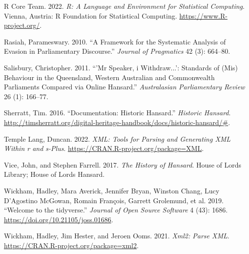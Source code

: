 \documentclass[
  letterpaper,
  DIV=11,
  numbers=noendperiod]{scrartcl}
\newlength{\cslhangindent}
\newlength{\cslentryspacingunit} %
\newenvironment{CSLReferences}[2] %
 {%
  \setlength{\parindent}{0pt}
  \ifodd #1
  \let\oldpar\par
  \def\par{\hangindent=\cslhangindent\oldpar}
  \fi
  \setlength{\parskip}{#2\cslentryspacingunit}
 }%
 {}
\begin{document}
\begin{CSLReferences}{1}{0}
\leavevmode{}%
R Core Team. 2022. \emph{R: A Language and Environment for Statistical
Computing}. Vienna, Austria: R Foundation for Statistical Computing.
\url{https://www.R-project.org/}.

\leavevmode{}%
Rasiah, Parameswary. 2010. {``A Framework for the Systematic Analysis of
Evasion in Parliamentary Discourse.''} \emph{Journal of Pragmatics} 42
(3): 664--80.

\leavevmode{}%
Salisbury, Christopher. 2011. {``'Mr Speaker, i Withdraw...': Standards
of (Mis) Behaviour in the Queensland, Western Australian and
Commonwealth Parliaments Compared via Online Hansard.''}
\emph{Australasian Parliamentary Review} 26 (1): 166--77.

\leavevmode{}%
Sherratt, Tim. 2016. {``Documentation: Historic Hansard.''}
\emph{Historic Hansard}.
\url{http://timsherratt.org/digital-heritage-handbook/docs/historic-hansard/\#}.

\leavevmode{}%
Temple Lang, Duncan. 2022. \emph{XML: Tools for Parsing and Generating
XML Within r and s-Plus}. \url{https://CRAN.R-project.org/package=XML}.

\leavevmode{}%
Vice, John, and Stephen Farrell. 2017. \emph{The History of Hansard}.
House of Lords Library; House of Lords Hansard.

\leavevmode{}%
Wickham, Hadley, Mara Averick, Jennifer Bryan, Winston Chang, Lucy
D'Agostino McGowan, Romain François, Garrett Grolemund, et al. 2019.
{``Welcome to the {tidyverse}.''} \emph{Journal of Open Source Software}
4 (43): 1686. \url{https://doi.org/10.21105/joss.01686}.

\leavevmode{}%
Wickham, Hadley, Jim Hester, and Jeroen Ooms. 2021. \emph{Xml2: Parse
XML}. \url{https://CRAN.R-project.org/package=xml2}.

\end{CSLReferences}
\end{document}
